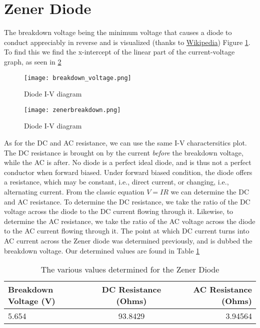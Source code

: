 \documentclass{article}
\begin{document}
\section{Zener Diode}\label{sec:zener-diode}
The breakdown voltage being the minimum voltage that causes a diode to conduct appreciably in reverse and is visualized (thanks to \href{https://en.wikipedia.org/wiki/Breakdown_voltage}{Wikipedia}) Figure \ref{fig:breakdown}.
To find this we find the x-intercept of the linear part of the current-voltage graph, as seen in \ref{fig:zenerbreakdown}
\begin{figure}
    \centering
    \texttt{[image: breakdown\_voltage.png]}
    \caption{Diode I-V diagram}
    \label{fig:breakdown}
\end{figure}
\begin{figure}
    \centering
    \texttt{[image: zenerbreakdown.png]}
    \caption{Diode I-V diagram}
    \label{fig:zenerbreakdown}
\end{figure}
As for the DC and AC resistance, we can use the same I-V charactersitics plot.
The DC resistance is brought on by the current \textit{before} the breakdown voltage, while the AC is after.
No diode is a perfect ideal diode, and is thus not a perfect conductor when forward biased.
Under forward biased condition, the diode offers a resistance, which may be constant, i.e., direct current, or changing, i.e., alternating current.
From the classic equation $V = IR$ we can determine the DC and AC resistance.
To determine the DC resistance, we take the ratio of the DC voltage across the diode to the DC current flowing through it.
Likewise, to determine the AC resistance, we take the ratio of the AC voltage across the diode to the AC current flowing through it.
The point at which DC current turns into AC current across the Zener diode was determined previously, and is dubbed the breakdown voltage.
Our determined values are found in Table \ref{tab:zenertable}

\begin{table}[h]
    \centering
    \begin{tabular}{l c r}
        Breakdown Voltage (V) & DC Resistance (Ohms) & AC Resistance (Ohms) \\
        \hline
        5.654 & 93.8429 & 3.94564 \\
    \end{tabular}
    \caption{The various values determined for the Zener Diode}
    \label{tab:zenertable}
\end{table}
\end{document}
